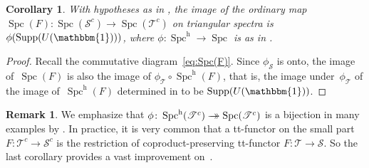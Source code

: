 \documentclass[JEP,XML,SOM,Unicode]{cedram}
\newcommand{\onto}{\mathchoice{\to\hspace*{-5mm}\to}{\to\hspace*{-2.85mm}\to}{\to\hspace*{-3mm}\to}{\to\hspace*{-3mm}\to}}
\numberwithin{equation}{section}
\newtheorem{Cor}[equation]{Corollary}
\theoremstyle{definition}
\newtheorem{Rem}[equation]{Remark}
\DeclareMathOperator{\Spc}{Spc}
\newcommand{\cat}[1]{\mathscr{#1}}
\newcommand{\unit}{\mathbbm{1}}
\newcommand{\smallh}{\mathrm{h}}
\DeclareMathOperator{\Supp}{Supp}
\newcommand{\cS}{\cat{S}}
\newcommand{\cT}{\cat{T}}
\newcommand{\SpchT}{\Spch(\cat{T}^c)}
\newcommand{\Spch}{\Spc^{\smallh}}
\newcommand{\SpcS}{\Spc(\cat{S}^c)}
\newcommand{\SpcT}{\Spc(\cat{T}^c)}
\begin{document}
\begin{Cor}
With hypotheses as in , the image of the ordinary map $\Spc(F)\colon\SpcS\to \SpcT$ on triangular spectra is~$\phi(\Supp(U(\unit)))$, where $\phi\colon \Spch\to\Spc$ is as in .
\end{Cor}

\begin{proof}
Recall the commutative diagram~\eqref{eq:Spc(F)}. Since $\phi_{\cS}$ is onto, the image of~$\Spc(F)$ is also the image of $\phi_{\cT}\circ\Spch(F)$, that is, the image under~$\phi_\cT$ of the image of~$\Spch(F)$ determined in  to be $\Supp(U(\unit))$.
\end{proof}

\begin{Rem}
We emphasize that $\phi\colon \SpchT\onto \SpcT$ is a bijection in many examples by \cite[\S5]{Balmer20a}. In practice, it is very common that a tt-functor on the small part $F\colon \cT^c\to \cS^c$ is the restriction of coproduct-preserving tt-functor $F\colon \cT\to \cS$. So the last corollary provides a vast improvement on~\cite{Balmer18a}.
\end{Rem}
\end{document}
